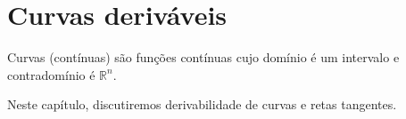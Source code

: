 \chapter{Curvas deriváveis}
Curvas (contínuas) são funções contínuas cujo domínio é um intervalo e contradomínio é $\mathbb R^n$.

Neste capítulo, discutiremos derivabilidade de curvas e retas tangentes.
